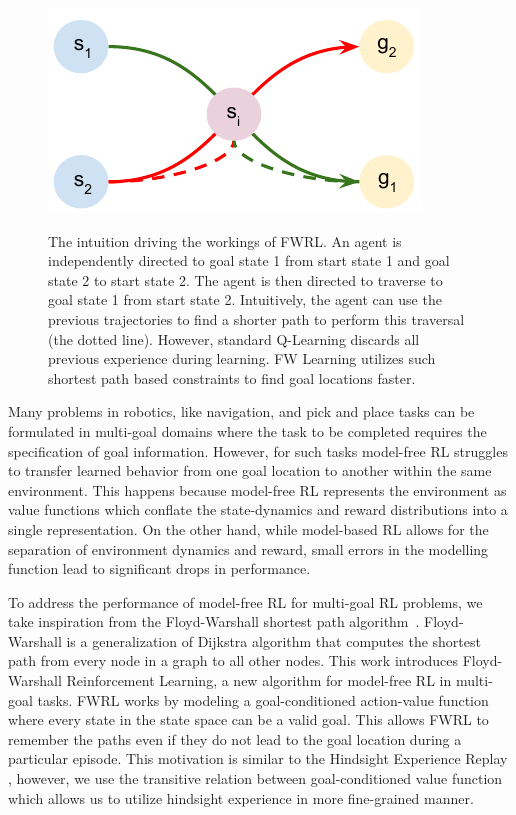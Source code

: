 \begin{figure}%
\includegraphics[width=\columnwidth]{./media/optimal_trajectories.pdf}\\
\caption{The intuition driving the workings of FWRL. An agent is
independently directed to goal state 1 from start state 1 and goal state
2 to start state 2. The agent is then directed to traverse to goal state
1 from start state 2. Intuitively, the agent can use the previous
trajectories to find a shorter path to perform this traversal (the
dotted line). However, standard Q-Learning discards all previous
experience during learning. FW Learning utilizes such shortest path
based constraints to find goal locations faster.  }
\label{fig:ql-fw-grid-world-results}%
\end{figure}

Many problems in robotics, like navigation, and  pick and place tasks can be
formulated in multi-goal domains where the task to be completed requires the
specification of goal information. However, for such tasks model-free RL struggles
to transfer learned behavior from one goal location to another within the same
environment. This happens because model-free RL represents the environment as
value functions which conflate the state-dynamics and reward distributions into
a single representation.
On the other hand, while model-based RL allows for the separation of environment
dynamics and reward, small errors in the modelling function lead to significant
drops in performance.

To address the performance of model-free RL for multi-goal RL problems, we take
inspiration from the Floyd-Warshall shortest path algorithm~\cite{floydwarshall1962}.
Floyd-Warshall is a generalization of Dijkstra algorithm that computes the
shortest path from every node in a graph to all other nodes.
This work introduces Floyd-Warshall Reinforcement Learning, a new algorithm for
model-free RL in multi-goal tasks. FWRL works by
modeling a goal-conditioned action-value function where every state in the state
space can be a valid goal. This allows FWRL to remember the paths even if they
do not lead to the goal location during a particular episode. This motivation is
similar to the Hindsight Experience Replay \cite{anderson2017vision}, however,
we use the transitive relation between goal-conditioned value function which
allows us to utilize hindsight experience in more fine-grained manner.

